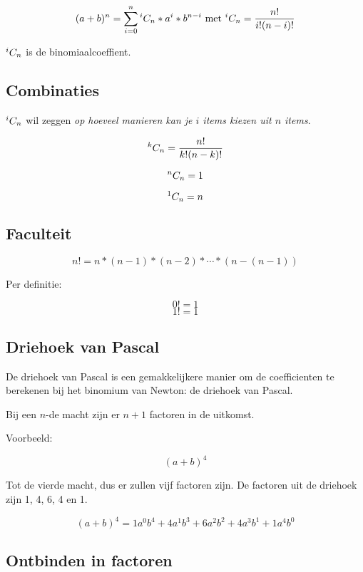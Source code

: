 \[
(a+b)^n = \sum_{i=0}^{n}{ {}^{i}C_{n} * a^i * b^{n-i} } \textrm{ met } {}^{i}C_{n} = \frac{n!}{i!(n-i)!}
\]

\({}^{i}C_{n}\) is de binomiaalcoeffient.

\subsection{Combinaties}

\({}^{i}C_{n}\) wil zeggen \emph{op hoeveel manieren kan je \(i\) items kiezen uit \(n\) items}.

\[
{}^{k}C_{n} = \frac{n!}{k!(n-k)!}
\]

\[ {}^{n}C_{n} = 1 \]

\[{}^{1}C_{n} = n\]

\subsection{Faculteit}

\[
n! = n * (n-1) * (n-2) * \cdots * (n - (n-1))
\]

Per definitie:

\[
0! = 1\]
\[1! = 1
\]

\subsection{Driehoek van Pascal}

De driehoek van Pascal is een gemakkelijkere manier om de coefficienten te berekenen bij het binomium van Newton: de driehoek van Pascal.


Bij een \(n\)-de macht zijn er \(n+1\) factoren in de uitkomst.

Voorbeeld:

\[
(a+b)^4
\]

Tot de vierde macht, dus er zullen vijf factoren zijn. De factoren uit de driehoek zijn 1, 4, 6, 4 en 1.

\[
(a+b)^4 = 1 a^0 b^4 + 4 a^1 b^3 + 6 a^2 b^2 + 4 a^3 b^1 + 1 a^4 b^0
\]

\subsection{Ontbinden in factoren}

